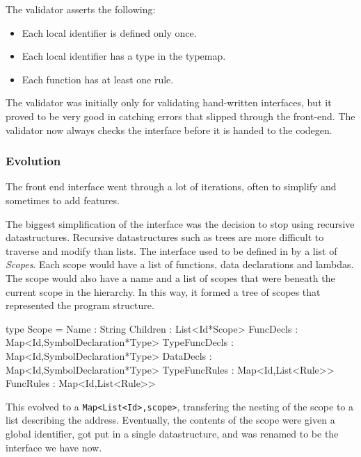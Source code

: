 The validator asserts the following:
\begin{itemize}
\item Each local identifier is defined only once.
\item Each local identifier has a type in the typemap.
\item Each function has at least one rule.
\end{itemize}

The validator was initially only for validating hand-written interfaces,
but it proved to be very good in catching errors that slipped through the front-end.
The validator now always checks the interface before it is handed to the codegen.

\subsubsection{Evolution}
The front end interface went through a lot of iterations, often to simplify and sometimes to add features.

The biggest simplification of the interface was the decision to stop using recursive datastructures.
Recursive datastructures such as trees are more difficult to traverse and modify than lists.
The interface used to be defined in by a list of \textit{Scopes}.
Each scope would have  a list of functions, data declarations and lambdas.
The scope would also have a name and a list of scopes that were beneath the current scope in the hierarchy.
In this way, it formed a tree of scopes that represented the program structure.

\begin{FS}
type Scope = {
  Name          : String
  Children      : List<Id*Scope>
  FuncDecls     : Map<Id,SymbolDeclaration*Type>
  TypeFuncDecls : Map<Id,SymbolDeclaration*Type>
  DataDecls     : Map<Id,SymbolDeclaration*Type>
  TypeFuncRules : Map<Id,List<Rule>>
  FuncRules     : Map<Id,List<Rule>>
}
\end{FS}

This evolved to a \verb|Map<List<Id>,scope>|, transfering the nesting of the scope to a list describing the address.
Eventually, the contents of the scope were given a global identifier, got put in a single datastructure, and was renamed to be the interface we have now.
